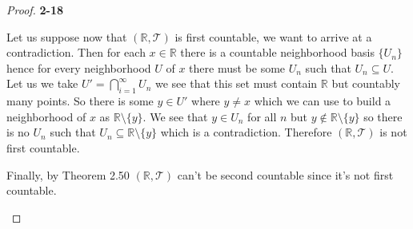 \documentclass[11pt]{article}
\newcommand{\R}{\mathbb{R}}
\newcommand{\setmin}{\setminus}
\theoremstyle{definition}
\begin{document}
\begin{proof}{\textbf{2-18}}
\begin{itemize}
    Let us suppose now that $(\R, \mathcal{T})$ is first countable, we want to
    arrive at a contradiction. Then for each $x \in \R$ there is a countable
    neighborhood basis $\{U_n\}$ hence for every neighborhood $U$ of $x$
    there must be some $U_n$ such that $U_n \subseteq U$.
    Let us we take $U' = \bigcap_{i=1}^{\infty} U_n$
    we see that this set must contain $\R$ but countably many points.
    So there is some $y \in U'$ where $y \neq x$ which we can use to build a
    neighborhood of $x$ as $\R \setmin \{y\}$.
    We see that $y \in U_n$ for all $n$ but $y \not\in \R \setmin \{y\}$
    so there is no $U_n$ such that $U_n \subseteq \R \setmin \{y\}$ which
    is a contradiction. Therefore $(\R, \mathcal{T})$ is not first countable.

    Finally, by Theorem 2.50 $(\R, \mathcal{T})$ can't be second countable
    since it's not first countable.
\end{itemize}
\end{proof}
\cleardoublepage
\end{document}
